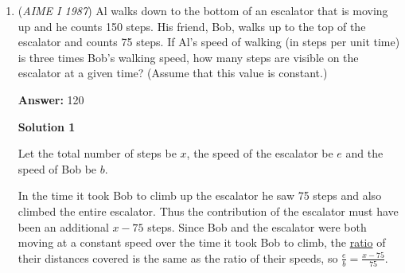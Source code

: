 \begin{enumerate}
 \textbf{Answer: }033



\textbf{Solution}

Let $PC = x$. Since $\angle APB = \angle BPC = \angle CPA$, each of them is equal to $120^\circ$.  By the \href{https://artofproblemsolving.com/wiki/index.php?title=Law\_of\_Cosines}{Law of Cosines} applied to triangles $\triangle APB$, $\triangle BPC$ and $\triangle CPA$ at their respective angles $P$, remembering that $\cos 120^\circ = -\frac12$, we have

 
 \[AB^2 = 36 + 100 + 60 = 196, BC^2 = 36 + x^2 + 6x, CA^2 = 100 + x^2 + 10x\]

 Then by the \href{https://artofproblemsolving.com/wiki/index.php?title=Pythagorean\_Theorem}{Pythagorean Theorem}, $AB^2 + BC^2 = CA^2$, so 

 
 \[x^2 + 10x + 100 = x^2 + 6x + 36 + 196\] 

 and

 
 \[4x = 132 \Longrightarrow x = \boxed{033}.\]

 \textbf{Note} This is the \href{https://artofproblemsolving.com/wiki/index.php?title=Fermat\_point}{Fermat point} of the triangle.

 


	\item (\textit{AIME I 1987}) Al walks down to the bottom of an escalator that is moving up and he counts 150 steps. His friend, Bob, walks up to the top of the escalator and counts 75 steps. If Al's speed of walking (in steps per unit time) is three times Bob's walking speed, how many steps are visible on the escalator at a given time? (Assume that this value is constant.) 


 
 \textbf{Answer: }120



\textbf{Solution 1}

Let the total number of steps be $x$, the speed of the escalator be $e$ and the speed of Bob be $b$.

 In the time it took Bob to climb up the escalator he saw 75 steps and also climbed the entire escalator.  Thus the contribution of the escalator must have been an additional $x - 75$ steps.  Since Bob and the escalator were both moving at a constant speed over the time it took Bob to climb, the \href{https://artofproblemsolving.com/wiki/index.php?title=Ratio}{ratio} of their distances covered is the same as the ratio of their speeds, so $\frac{e}{b} = \frac{x - 75}{75}$.  


\end{enumerate}
